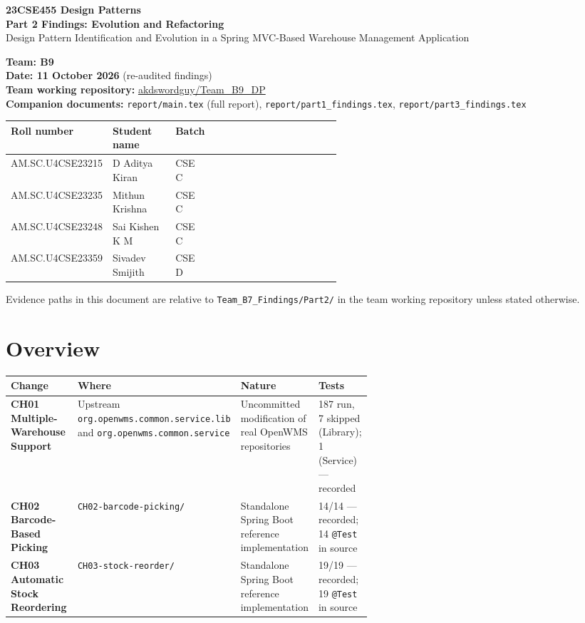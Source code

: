 \documentclass[11pt,a4paper]{article}
\title{}
\author{}
\date{}
\newcommand{\code}[1]{\nolinkurl{#1}}
\begin{document}
\begin{center}
{\Large\textbf{23CSE455 Design Patterns}}\\[4pt]
{\LARGE\textbf{Part 2 Findings: Evolution and Refactoring}}\\[6pt]
{\large Design Pattern Identification and Evolution in a Spring MVC-Based Warehouse Management Application}
\end{center}

\textbf{Team: B9}\\
\textbf{Date: 11 October 2026} (re-audited findings)\\
\textbf{Team working repository:} \href{https://github.com/akdswordguy/Team_B9_DP}{akdswordguy/Team\_B9\_DP}\\
\textbf{Companion documents:} \code{report/main.tex} (full report), \code{report/part1_findings.tex}, \code{report/part3_findings.tex}


\begin{tabularx}{\linewidth}{@{}P{0.25\linewidth}P{0.19\linewidth}P{0.10\linewidth}X@{}}
\toprule
Roll number & Student name & Batch \\
\midrule
AM.SC.U4CSE23215 & D Aditya Kiran & CSE C \\
AM.SC.U4CSE23235 & Mithun Krishna & CSE C \\
AM.SC.U4CSE23248 & Sai Kishen K M & CSE C\\
AM.SC.U4CSE23359 & Sivadev Smijith & CSE D \\
\bottomrule
\end{tabularx}

Evidence paths in this document are relative to \code{Team_B7_Findings/Part2/} in the team working repository unless stated otherwise.

\section{Overview}

\begin{tabularx}{\linewidth}{@{}P{0.22\linewidth}P{0.20\linewidth}YP{0.17\linewidth}@{}}
\toprule
Change & Where & Nature & Tests\\
\midrule
\textbf{CH01 Multiple-Warehouse Support} & Upstream \code{org.openwms.common.service.lib} and \code{org.openwms.common.service} & Uncommitted modification of real OpenWMS repositories & 187 run, 7 skipped (Library); 1 (Service) --- recorded\\
\textbf{CH02 Barcode-Based Picking} & \code{CH02-barcode-picking/} & Standalone Spring Boot reference implementation & 14/14 --- recorded; 14 \code{@Test} in source\\
\textbf{CH03 Automatic Stock Reordering} & \code{CH03-stock-reorder/} & Standalone Spring Boot reference implementation & 19/19 --- recorded; 19 \code{@Test} in source\\
\bottomrule
\end{tabularx}
\end{document}
